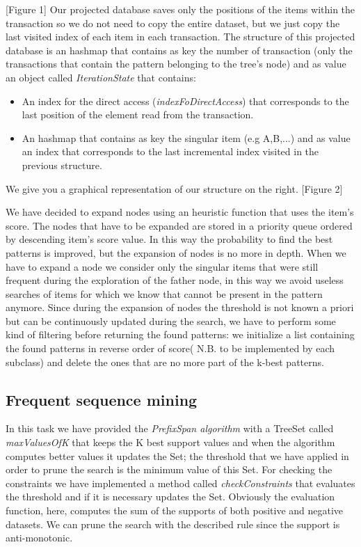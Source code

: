 \documentclass[10pt, a4paper]{article}
\begin{document}
	[Figure 1]
	\newline
	Our projected database saves only the positions of the items within the transaction so we do not need to copy the entire dataset, but we just copy the last visited index of each item in each transaction. 
	The structure of this projected database is an hashmap that contains as key the number of transaction (only the transactions that contain the pattern belonging to the tree's node) and as value an object called \textit{IterationState} that contains:
	\begin{itemize}
		\item An index for the direct access (\textit{indexFoDirectAccess}) that corresponds to the last position of the element read from the transaction.
		\item An hashmap that contains as key the singular item (e.g A,B,...) and as value an index that corresponds to the last incremental index visited in the previous structure.
	\end{itemize}
	We give you a graphical representation of our structure on the right. [Figure 2]
	
	We have decided to expand nodes using an heuristic function that uses the item's score. The nodes that have to be expanded are stored in a priority queue ordered by descending item's score value. In this way the probability to find the best patterns is improved, but the expansion of nodes is no more in depth.
	When we have to expand a node we consider only the singular items that were still frequent during the exploration of the father node, in this way we avoid useless searches of items for which we know that cannot be present in the pattern anymore.
	\newline\newline
	Since during the expansion of nodes the threshold is not known a priori but can be continuously updated during the search, we have to perform some kind of filtering before returning the found patterns: we initialize a list containing the found patterns in reverse order of score( N.B. to be implemented by each subclass) and delete the ones that are no more part of the k-best patterns.

	\subsection{Frequent sequence mining}
	In this task we have provided the \textit{PrefixSpan algorithm} with a TreeSet called \textit{maxValuesOfK} that keeps the K best support values and when the algorithm computes better values it updates the Set; the threshold that we have applied in order to prune the search is the minimum value of this Set.
	For checking the constraints we have implemented a method called \textit{checkConstraints} that evaluates the threshold and if it is necessary updates the Set. Obviously the evaluation function, here, computes the sum of the supports of both positive and negative datasets.
	We can prune the search with the described rule since the support is anti-monotonic.
\end{document}
